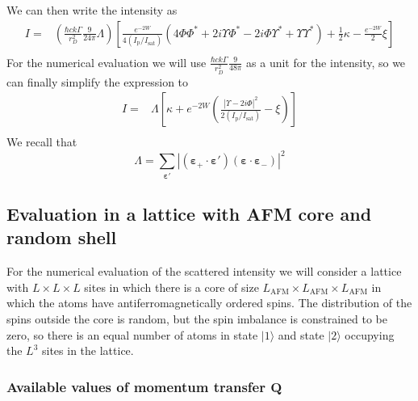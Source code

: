\documentclass[11pt,letter]{article}
\newcommand{\bv}[1]{\ensuremath{\bm{#1}}}
\newcommand{\iisat}{\ensuremath{I_{\mathrm{p}}/I_{\mathrm{sat}}}}
\begin{document}
We can then write the intensity as 
\begin{equation}
\begin{split}
 I  = &
 \left( 
 \frac{\hbar c k \Gamma}{r_{D}^{2}}  
     \frac{9}{24\pi} \Lambda 
  \right)
  \left[
  \frac{ e^{-2W} }{ 4 (\iisat)}
  \left( 
    4 \Phi \Phi^{*}
    + 2i \Upsilon \Phi^{*} 
    - 2i \Phi \Upsilon^{*}
    + \Upsilon \Upsilon^{*}  
          \right)
  + \frac{1}{2}\kappa - \frac{ e^{-2W}}{2} \xi
\right] \\ 
\end{split}
\end{equation}
For the numerical evaluation we will use $\frac{\hbar c k \Gamma}{r_{D}^{2}}  
     \frac{9}{48\pi}$  as a unit for the intensity, so we can finally simplify the expression to
\begin{equation}
\begin{split}
  I  = &
 \Lambda 
  \left[
  \kappa + 
  e^{-2W} \left(  
  \frac{ | \Upsilon - 2 i \Phi |^{2} }{  2 (\iisat)}
   - \xi \right)
  \right] \\ 
\end{split}
\end{equation}
We recall that 
\begin{equation}
 \Lambda = 
  \sum_{\bv{\varepsilon}' }
        | (\bv{\varepsilon}_{+}\cdot \bv{\varepsilon}' )
                        (\bv{\varepsilon}\cdot \bv{\varepsilon}_{-} ) |^{2} 
\end{equation} 

\subsection{Evaluation in a lattice with AFM core and random shell}

For the numerical evaluation of the scattered intensity we will consider a
lattice with $L\times L\times L$ sites in which there is a core of size
$L_{\mathrm{AFM}} \times L_{\mathrm{AFM}} \times L_{\mathrm{AFM}}$ in which the
atoms have antiferromagnetically ordered spins.   The distribution of the spins
outside the core is random, but the spin imbalance is constrained to be zero,
so there is an equal number of atoms in state $|1\rangle$ and state
$|2\rangle $  occupying the $L^{3}$ sites in the lattice.

\subsubsection{Available values of momentum transfer $\bv{Q}$}
\end{document}
